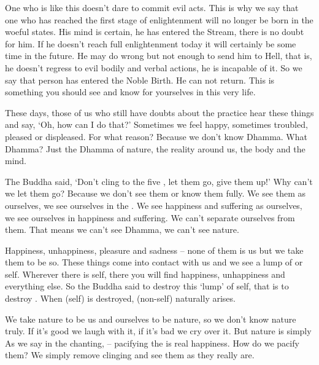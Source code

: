 One who is like this doesn't dare to commit evil acts. This is why we say that one who has reached the first stage of enlightenment will no longer be born in the woeful states. His mind is certain, he has entered the Stream, there is no doubt for him. If he doesn't reach full enlightenment today it will certainly be some time in the future. He may do wrong but not enough to send him to Hell, that is, he doesn't regress to evil bodily and verbal actions, he is incapable of it. So we say that person has entered the Noble Birth. He can not return. This is something you should see and know for yourselves in this very life. 

These days, those of us who still have doubts about the practice hear these things and say, `Oh, how can I do that?' Sometimes we feel happy, sometimes troubled, pleased or displeased. For what reason? Because we don't know Dhamma. What Dhamma? Just the Dhamma of nature, the reality around us, the body and the mind. 

The Buddha said, `Don't cling to the five , let them go, give them up!' Why can't we let them go? Because we don't see them or know them fully. We see them as ourselves, we see ourselves in the . We see happiness and suffering as ourselves, we see ourselves in happiness and suffering. We can't separate ourselves from them. That means we can't see Dhamma, we can't see nature. 

Happiness, unhappiness, pleasure and sadness -- none of them is us but we take them to be so. These things come into contact with us and we see a lump of  or self. Wherever there is self, there you will find happiness, unhappiness and everything else. So the Buddha said to destroy this `lump' of self, that is to destroy . When  (self) is destroyed,  (non-self) naturally arises. 

We take nature to be us and ourselves to be nature, so we don't know nature truly. If it's good we laugh with it, if it's bad we cry over it. But nature is simply  As we say in the chanting,  -- pacifying the  is real happiness. How do we pacify them? We simply remove clinging and see them as they really are.


